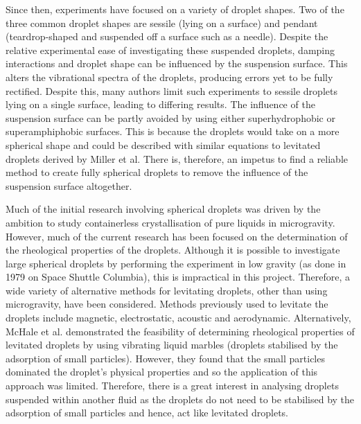 \documentclass{physics_article_B}
\begin{document}
    Since then, experiments have focused on a variety of droplet shapes. Two of the three common droplet shapes are sessile (lying on a surface)\cite{vukasinovic, Backholm2017, Temperton2012} and pendant (teardrop-shaped and suspended off a surface such as a needle)\cite{Temperton2012}. Despite the relative experimental ease of investigating these suspended droplets, damping interactions and droplet shape can be influenced by the suspension surface\cite{Sharp2011}. This alters the vibrational spectra of the droplets, producing errors yet to be fully rectified\cite{harrold}. Despite this, many authors limit such experiments to sessile droplets lying on a single surface\cite{Sharp2011}, leading to differing results. The influence of the suspension surface can be partly avoided by using either superhydrophobic or superamphiphobic surfaces\cite{harrold}. This is because the droplets would take on a more spherical shape and could be described with similar equations to levitated droplets derived by Miller et al. There is, therefore, an impetus to find a reliable method to create fully spherical droplets to remove the influence of the suspension surface altogether.
    
    Much of the initial research involving spherical droplets was driven by the ambition to study containerless crystallisation of pure liquids in microgravity\cite{wilkes}. However, much of the current research has been focused on the determination of the rheological properties of the droplets\cite{harrold2,benmore,capillary}. Although it is possible to investigate large spherical droplets by performing the experiment in low gravity (as done in 1979\cite{holt} on Space Shuttle Columbia), this is impractical in this project. Therefore, a wide variety of alternative methods for levitating droplets, other than using microgravity, have been considered. Methods previously used to levitate the droplets include magnetic\cite{temperton, hill}, electrostatic\cite{mugele, wong}, acoustic\cite{trinh, Yarin1998} and aerodynamic\cite{benmore}. Alternatively, McHale et al. demonstrated the feasibility of determining rheological properties of levitated droplets by using vibrating liquid marbles (droplets stabilised by the adsorption of small particles). However, they found that the small particles dominated the droplet's physical properties and so the application of this approach was limited\cite{mchale}. Therefore, there is a great interest in analysing droplets suspended within another fluid as the droplets do not need to be stabilised by the adsorption of small particles and hence, act like levitated droplets. 
    
\end{document}
